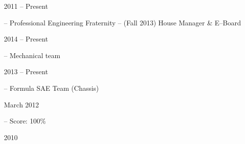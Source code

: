 

\flushleft \begin{minipage}[t]{\dateColWidth}
2011 -- Present
\end{minipage}
\begin{minipage}[t]{0.8\textwidth}
 -- Professional Engineering Fraternity -- (Fall 2013) House Manager \& E--Board 
\end{minipage}

\flushleft \begin{minipage}[t]{\dateColWidth}
2014 -- Present
\end{minipage}
\begin{minipage}[t]{0.8\textwidth}
 -- Mechanical team
\end{minipage}

\flushleft \begin{minipage}[t]{\dateColWidth}
2013 -- Present
\end{minipage}
\begin{minipage}[t]{0.8\textwidth}
 -- Formula SAE Team (Chassis)
\end{minipage}

\flushleft \begin{minipage}[t]{\dateColWidth}
March 2012
\end{minipage}
\begin{minipage}[t]{0.8\textwidth}
 -- Score: 100\%
\end{minipage}

\flushleft \begin{minipage}[t]{\dateColWidth}
2010
\end{minipage}
\begin{minipage}[t]{0.8\textwidth}
\end{minipage}













